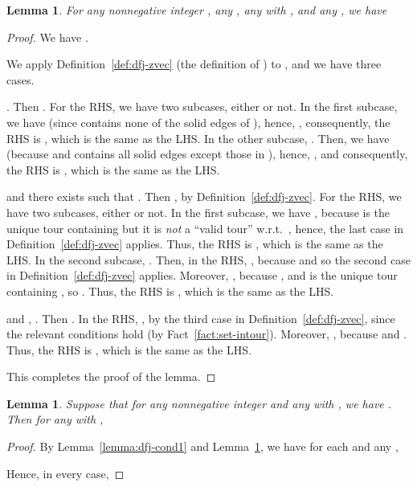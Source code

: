 \documentclass[11pt]{article}
\newtheorem{lemma}[theorem]{Lemma}
\begin{document}
\begin{lemma}
\label{lemma:dfj-recursive}
For any nonnegative integer ,
any ,
any  with ,
and any ,
we have

\end{lemma}
\begin{proof}
We have .

We apply Definition~\ref{def:dfj-zvec} (the definition of )
to , and we have three cases.

\begin{description}{
\item[Case~1.]
.
Then .
For the RHS, we have two subcases, either  or not.
In the first subcase, we have 
(since  contains none of the solid edges of ),
hence, ,
consequently, the RHS is
,
which is the same as the LHS.
In the other subcase, .
Then, we have 
(because  and  contains all solid edges
except those in ), hence,
,
and consequently, the RHS is
,
which is the same as the LHS.

\item[Case~2.]
 and
there exists  such that .
Then ,
by Definition~\ref{def:dfj-zvec}.
For the RHS, we have two subcases, either  or not.
In the first subcase, we have ,
because  is the unique tour containing 
but it is \emph{not} a ``valid tour'' w.r.t.\ ,
hence, the last case in Definition~\ref{def:dfj-zvec} applies.
Thus, the RHS is
,
which is the same as the LHS.
In the second subcase, .
Then, in the RHS, ,
because  and 
so the second case in Definition~\ref{def:dfj-zvec} applies.
Moreover, ,
because , and  is the unique tour containing ,
so .
Thus, the RHS is
,
which is the same as the LHS.

\item[Case~3.]
 and
, .
Then .
In the RHS, ,
by the third case in Definition~\ref{def:dfj-zvec},
since the relevant conditions hold (by Fact~\ref{fact:set-intour}).
Moreover, ,
because  and .
Thus, the RHS is
,
which is the same as the LHS.
}\end{description}
This completes the proof of the lemma.
\end{proof}


\begin{lemma}
\label{lemma:dfj-cond2}
Suppose that for any nonnegative integer  and
any  with ,
we have . Then for any  with ,

\end{lemma}
\begin{proof}By Lemma~\ref{lemma:dfj-cond1} and
Lemma~\ref{lemma:dfj-recursive}, we have for each  and
any ,

Hence, in every case, 
\end{proof}
\end{document}
